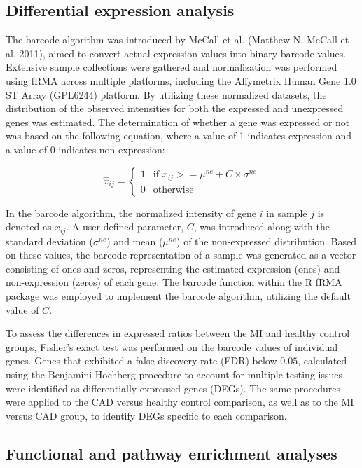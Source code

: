 \documentclass[smallextended]{svjour3}       %
\begin{document}
\hypertarget{differential-expression-analysis}{%
\subsection{Differential expression
analysis}\label{differential-expression-analysis}}

The barcode algorithm was introduced by McCall et al. (Matthew N. McCall
et al. 2011), aimed to convert actual expression values into binary
barcode values. Extensive sample collections were gathered and
normalization was performed using fRMA across multiple platforms,
including the Affymetrix Human Gene 1.0 ST Array (GPL6244) platform. By
utilizing these normalized datasets, the distribution of the observed
intensities for both the expressed and unexpressed genes was estimated.
The determination of whether a gene was expressed or not was based on
the following equation, where a value of 1 indicates expression and a
value of 0 indicates non-expression:

\[
\hat{x}_{ij} = \left\{
  \begin{array}{ll}
    1 & \mbox{if } x_{ij} >= \mu^{ne} + C \times \sigma^{ne} \\
    0 & \mbox{otherwise}
  \end{array}
\right.
\]

In the barcode algorithm, the normalized intensity of gene \(i\) in
sample \(j\) is denoted as \(x_{ij}\). A user-defined parameter, \(C\),
was introduced along with the standard deviation (\(\sigma^{ne}\)) and
mean (\(\mu^{ne}\)) of the non-expressed distribution. Based on these
values, the barcode representation of a sample was generated as a vector
consisting of ones and zeros, representing the estimated expression
(ones) and non-expression (zeros) of each gene. The barcode function
within the R fRMA package was employed to implement the barcode
algorithm, utilizing the default value of \(C\).

To assess the differences in expressed ratios between the MI and healthy
control groups, Fisher's exact test was performed on the barcode values
of individual genes. Genes that exhibited a false discovery rate (FDR)
below \(0.05\), calculated using the Benjamini-Hochberg procedure to
account for multiple testing issues were identified as differentially
expressed genes (DEGs). The same procedures were applied to the CAD
versus healthy control comparison, as well as to the MI versus CAD
group, to identify DEGs specific to each comparison.

\hypertarget{functional-and-pathway-enrichment-analyses}{%
\subsection{Functional and pathway enrichment
analyses}\label{functional-and-pathway-enrichment-analyses}}
\end{document}
